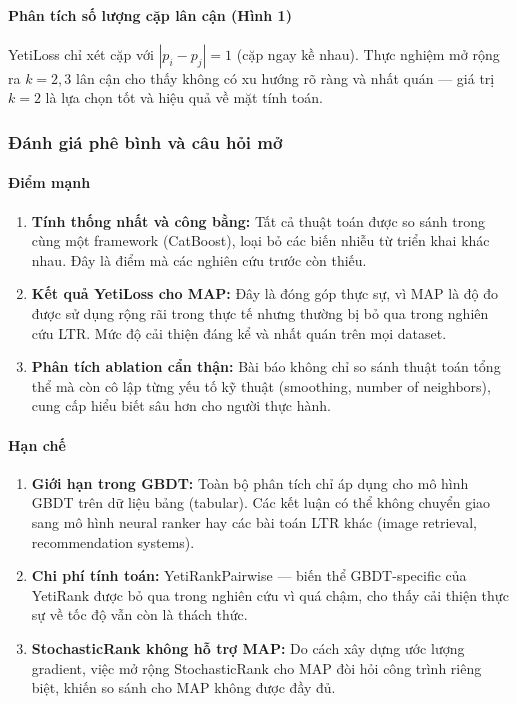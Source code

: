 \paragraph{Phân tích số lượng cặp lân cận (Hình 1)}
YetiLoss chỉ xét cặp với $|p_i - p_j| = 1$ (cặp ngay kề nhau). Thực nghiệm mở rộng ra $k = 2, 3$ lân cận cho thấy không có xu hướng rõ ràng và nhất quán --- giá trị $k = 2$ là lựa chọn tốt và hiệu quả về mặt tính toán.

\subsubsection{Đánh giá phê bình và câu hỏi mở}
\paragraph{Điểm mạnh}
\begin{enumerate}
  \item \textbf{Tính thống nhất và công bằng:} Tất cả thuật toán được so sánh trong cùng một framework (CatBoost), loại bỏ các biến nhiễu từ triển khai khác nhau. Đây là điểm mà các nghiên cứu trước còn thiếu.
  \item \textbf{Kết quả YetiLoss cho MAP:} Đây là đóng góp thực sự, vì MAP là độ đo được sử dụng rộng rãi trong thực tế nhưng thường bị bỏ qua trong nghiên cứu LTR. Mức độ cải thiện đáng kể và nhất quán trên mọi dataset.
  \item \textbf{Phân tích ablation cẩn thận:} Bài báo không chỉ so sánh thuật toán tổng thể mà còn cô lập từng yếu tố kỹ thuật (smoothing, number of neighbors), cung cấp hiểu biết sâu hơn cho người thực hành.
\end{enumerate}

\paragraph{Hạn chế}
\begin{enumerate}
  \item \textbf{Giới hạn trong GBDT:} Toàn bộ phân tích chỉ áp dụng cho mô hình GBDT trên dữ liệu bảng (tabular). Các kết luận có thể không chuyển giao sang mô hình neural ranker hay các bài toán LTR khác (image retrieval, recommendation systems).
  \item \textbf{Chi phí tính toán:} YetiRankPairwise --- biến thể GBDT-specific của YetiRank được bỏ qua trong nghiên cứu vì quá chậm, cho thấy cải thiện thực sự về tốc độ vẫn còn là thách thức.
  \item \textbf{StochasticRank không hỗ trợ MAP:} Do cách xây dựng ước lượng gradient, việc mở rộng StochasticRank cho MAP đòi hỏi công trình riêng biệt, khiến so sánh cho MAP không được đầy đủ.
\end{enumerate}

